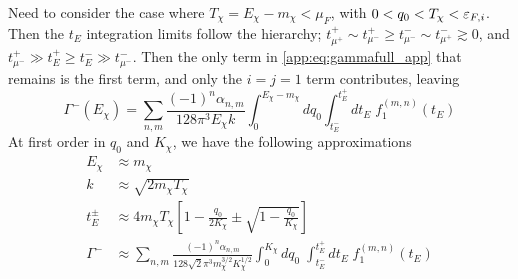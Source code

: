Need to consider the case where $T_\chi = E_\chi - m_\chi <\mu_{F}$, with $0<q_0<T_\chi<\varepsilon_{F,i}$. Then the $t_E$ integration limits follow the hierarchy; $t_{\mu^{+}}^{+} \sim t_{\mu^{-}}^{+} \ge t_{\mu^{-}}^{-} \sim t_{\mu^{+}}^{-} \gtrsim 0$, and $t_{\mu^{-}}^{+} \gg t_E^+ \ge t_E^- \gg t_{\mu^{-}}^{-}$. Then the only term in \ref{app:eq:gammafull_app} that remains is the first term, and only the $i=j=1$ term contributes, leaving
\begin{equation}
    \Gamma^-(E_\chi) = \sum_{n,m}  \frac{(-1)^n \alpha_{n,m}}{128\pi^3 E_\chi k }\int_0^{E_\chi -m_\chi} dq_0\int_{t_E^-}^{t_E^+} d t_E\; f_1^{(m,n)}(t_E)
\end{equation}
At first order in $q_0$ and $K_\chi$, we have the following approximations
\begin{align}
    E_\chi &\approx m_\chi\\
    k &\approx \sqrt{2m_\chi T_\chi}\\
    t_E^\pm &\approx 4m_\chi T_\chi \left[ 1 - \frac{q_0}{2 K_\chi}\pm \sqrt{1 - \frac{q_0}{K_\chi}} \right]\\
    \Gamma^- & \approx \sum_{n,m}\frac{(-1)^n \alpha_{n,m}}{128\sqrt{2} \pi^3 m_\chi^{3/2}K_\chi^{1/2}}\int_0^{K_\chi} dq_0\;\int_{t_E^-}^{t_E^+} dt_E\;f_1^{(m,n)}(t_E)
\end{align}

